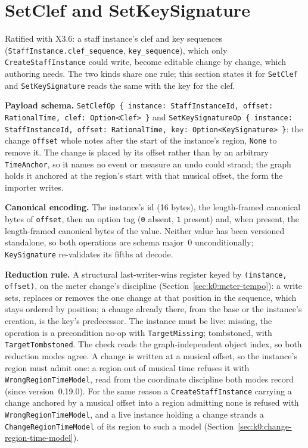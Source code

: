 \documentclass[11pt,letterpaper]{report}
\begin{document}
\section{SetClef and SetKeySignature}
\label{sec:k0:set-clef}

Ratified with X3.6: a staff instance's clef and key sequences
(\texttt{StaffInstance.clef\_sequence}, \texttt{key\_sequence}), which only
\texttt{CreateStaffInstance} could write, become editable change by change,
which authoring needs. The two kinds share one rule; this section states it
for \texttt{SetClef} and \texttt{SetKeySignature} reads the same with the key
for the clef.

\textbf{Payload schema.} \texttt{SetClefOp \{ instance: StaffInstanceId,
offset: RationalTime, clef: Option<Clef> \}} and \texttt{SetKeySignatureOp
\{ instance: StaffInstanceId, offset: RationalTime, key:
Option<KeySignature> \}}: the change \texttt{offset} whole notes after the
start of the instance's region, \texttt{None} to remove it. The change is
placed by its offset rather than by an arbitrary \texttt{TimeAnchor}, so it
names no event or measure an undo could strand; the graph holds it anchored
at the region's start with that musical offset, the form the importer writes.

\textbf{Canonical encoding.} The instance's id (16 bytes), the length-framed
canonical bytes of \texttt{offset}, then an option tag (\texttt{0} absent,
\texttt{1} present) and, when present, the length-framed canonical bytes of the
value. Neither value has been versioned standalone, so both operations are
schema major~0 unconditionally; \texttt{KeySignature} re-validates its fifths
at decode.

\textbf{Reduction rule.} A structural last-writer-wins register keyed by
\texttt{(instance, offset)}, on the meter change's discipline
(Section~\ref{sec:k0:meter-tempo}): a write sets, replaces or removes the
one change at that position in the sequence, which stays ordered by
position; a change already there, from the base or the instance's creation,
is the key's predecessor. The instance must be live: missing, the operation
is a precondition no-op with \texttt{TargetMissing}; tombstoned, with
\texttt{TargetTombstoned}. The check reads the graph-independent object
index, so both reduction modes agree. A change is written at a musical offset,
so the instance's region must admit one: a region out of musical time refuses
it with \texttt{WrongRegionTimeModel}, read from the coordinate discipline
both modes record (since version~0.19.0). For the same reason a
\texttt{CreateStaffInstance} carrying a change anchored by a musical offset
into a region admitting none is refused with \texttt{WrongRegionTimeModel},
and a live instance holding a change strands a
\texttt{ChangeRegionTimeModel} of its region to such a model
(Section~\ref{sec:k0:change-region-time-model}).
\end{document}
